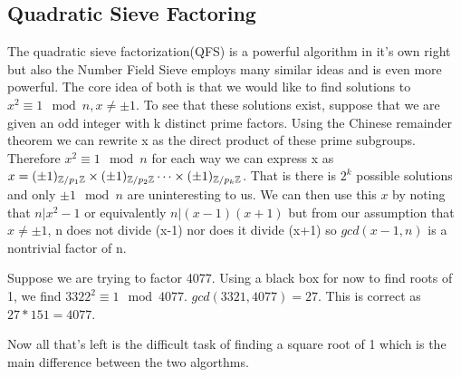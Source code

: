 \documentclass{article}
\begin{document}
\subsection{Quadratic Sieve Factoring}
The quadratic sieve factorization(QFS) is a powerful algorithm in it's own right but also the Number Field Sieve employs many similar ideas and is even more powerful. The core idea of both is that we would like to find solutions to $x^2 \equiv 1 \mod n, x \neq \pm 1$. To see that these solutions exist, suppose that we are given an odd integer with k distinct prime factors. Using the Chinese remainder theorem we can rewrite x as the direct product of these prime subgroups. Therefore $x^2 \equiv 1 \mod n$ for each way we can express x as $x = (\pm 1)_{\mathbb{Z} / p_1 \mathbb{Z}} \times (\pm 1)_{\mathbb{Z} / p_2\mathbb{Z}} \cdots \times (\pm 1)_{\mathbb{Z} / p_k\mathbb{Z}} $. That is there is $2^k$ possible solutions and only $\pm 1 \mod n$ are uninteresting to us.  We can then use this $x$ by noting that $n | x^2 - 1$ or equivalently $n | (x-1) ( x+1)$ but from our assumption that $x \neq \pm 1$, n does not divide (x-1) nor does it divide (x+1) so $gcd(x-1, n)$ is a nontrivial factor of n.
\begin{example}
Suppose we are trying to factor 4077. Using a black box for now to find roots of 1, we find $3322^2 \equiv 1 \mod 4077$. $gcd(3321,4077) = 27$. This is correct as  $27 * 151 = 4077$.
\end{example}
Now all that's left is the difficult task of finding a square root of 1 which is the main difference between the two algorthms.
\end{document}
